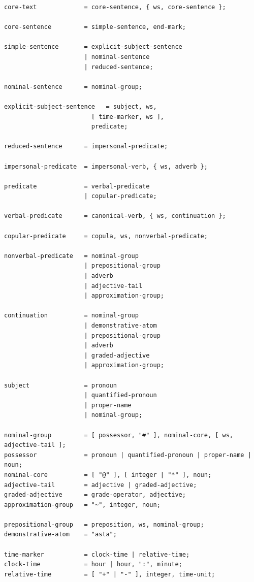 \documentclass[12pt,onecolumn,letterpaper]{article}
\newcommand{\RSEBNFLayout}{\footnotesize}
\begin{document}
\RSEBNFLayout
\begin{verbatim}
core-text             = core-sentence, { ws, core-sentence };

core-sentence         = simple-sentence, end-mark;

simple-sentence       = explicit-subject-sentence
                      | nominal-sentence
                      | reduced-sentence;

nominal-sentence      = nominal-group;

explicit-subject-sentence	= subject, ws,
						[ time-marker, ws ],
						predicate;

reduced-sentence      = impersonal-predicate;

impersonal-predicate  = impersonal-verb, { ws, adverb };

predicate             = verbal-predicate
                      | copular-predicate;

verbal-predicate      = canonical-verb, { ws, continuation };

copular-predicate     = copula, ws, nonverbal-predicate;

nonverbal-predicate   = nominal-group
                      | prepositional-group
                      | adverb
                      | adjective-tail
                      | approximation-group;

continuation          = nominal-group
                      | demonstrative-atom
                      | prepositional-group
                      | adverb
                      | graded-adjective
                      | approximation-group;

subject               = pronoun
                      | quantified-pronoun
                      | proper-name
                      | nominal-group;

nominal-group         = [ possessor, "#" ], nominal-core, [ ws, adjective-tail ];
possessor             = pronoun | quantified-pronoun | proper-name | noun;
nominal-core          = [ "@" ], [ integer | "*" ], noun;
adjective-tail        = adjective | graded-adjective;
graded-adjective      = grade-operator, adjective;
approximation-group   = "~", integer, noun;

prepositional-group   = preposition, ws, nominal-group;
demonstrative-atom    = "asta";

time-marker           = clock-time | relative-time;
clock-time            = hour | hour, ":", minute;
relative-time         = [ "+" | "-" ], integer, time-unit;


\end{verbatim}
\end{document}
